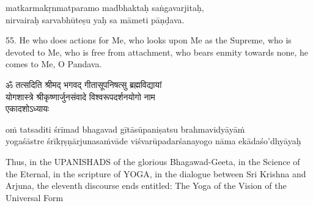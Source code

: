 \begin{transliteration}
matkarmakṛnmatparamo madbhaktaḥ saṅgavarjitaḥ, \\
nirvairaḥ sarvabhūteṣu yaḥ sa māmeti pāṇḍava.
\end{transliteration}

55. He who does actions for Me, who looks upon Me as the Supreme, who is
devoted to Me, who is free from attachment, who bears enmity towards none, he
comes to Me, O Pandava.

\begin{gitaverse}
ॐ तत्सदिति श्रीमद् भगवद् गीतासूपनिषत्सु ब्रह्मविद्यायां \\
योगशास्त्रे श्रीकृष्णार्जुनसंवादे विश्वरूपदर्शनयोगो नाम \\
एकादशोऽध्यायः
\end{gitaverse}

\begin{transliteration}
oṁ tatsaditi śrīmad bhagavad gītāsūpaniṣatsu brahmavidyāyāṁ \\
yogaśāstre śrīkṛṣṇārjunasaṁvāde viśvarūpadarśanayogo nāma ekādaśo'dhyāyaḥ
\end{transliteration}

Thus, in the UPANISHADS of the glorious Bhagawad-Geeta, in the Science of the
Eternal, in the scripture of YOGA, in the dialogue between Sri Krishna and
Arjuna, the eleventh discourse ends entitled: The Yoga of the Vision of the
Universal Form
